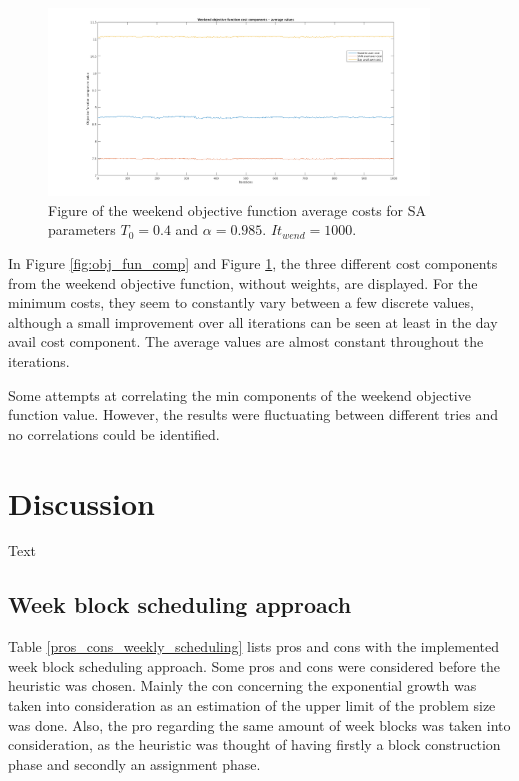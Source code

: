 \begin{figure}[!h]
\centering
\includegraphics[width=0.9\textwidth, trim = 100px 0px 100px 20px, clip]{Chapters/ImagesEmelie/Components_av_1000_20.png}
\caption{Figure of the weekend objective function average costs for SA parameters $T_0 = 0.4$ and $\alpha = 0.985$. $It_{wend} = 1000$.}
\label{fig:obj_fun_comp_aver}
\end{figure}


In Figure \ref{fig:obj_fun_comp} and Figure \ref{fig:obj_fun_comp_aver}, the three different cost components from the weekend objective function, without weights, are displayed. For the minimum costs, they seem to constantly vary between a few discrete values, although a small improvement over all iterations can be seen at least in the day avail cost component. The average values are almost constant throughout the iterations.

Some attempts at correlating the min components of the weekend objective function value. However, the results were fluctuating between different tries and no correlations could be identified.

\section{Discussion}
Text


\subsection{Week block scheduling approach}
Table \ref{pros_cons_weekly_scheduling} lists pros and cons with the implemented week block scheduling approach. Some pros and cons were considered before the heuristic was chosen. Mainly the con concerning the exponential growth was taken into consideration as an estimation of the upper limit of the problem size was done. Also, the pro regarding the same amount of week blocks was taken into consideration, as the heuristic was thought of having firstly a block construction phase and secondly an assignment phase. 

